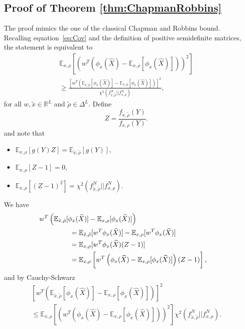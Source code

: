 \documentclass{IEEEtran}
\numberwithin{equation}{section}
\numberwithin{figure}{section}
\theoremstyle{plain}
\theoremstyle{definition}
\theoremstyle{remark}
\theoremstyle{plain}
\theoremstyle{remark}
\theoremstyle{plain}
\theoremstyle{plain}
\theoremstyle{remark}
\newcommand{\RL}{\mathbb{R}^L}
\newcommand{\E}{\mathbb{E}}
\begin{document}
\subsection{Proof of Theorem \ref{thm:ChapmanRobbins}}
\label{proof:ChapmanRobbins}
The proof mimics the one of the classical Chapman and Robbins bound. Recalling equation~\eqref{eq:Cov} and the definition of positive semidefinite matrices, the statement is equivalent to 
\begin{multline}\label{eq:chapmanrobbins}
\E_{x,\rho}\left[\left(w^T(\phi_x(\widehat X)-\E_{x,\rho}[\phi_{x}(\widehat X)])\right)^2\right]\\\ge \frac{\left[w^T\left(\E_{\tilde x,\tilde \rho}[\phi_{x}(\widehat X)]-\E_{x,\rho}[\phi_{x}(\widehat X)]\right)\right]^2}{\chi^2(f^N_{\tilde x,\tilde \rho}||f^N_{x,\rho})},
\end{multline}
for all $w,\tilde x\in\RL$ and $\tilde \rho\in \Delta^L$. Define $$Z=\frac{f_{\tilde x,\tilde \rho}(Y)}{f_{x,\rho}(Y)}.$$
and note that
\begin{itemize}
	\item $\E_{x,\rho}[g(Y)Z]=\E_{\tilde x,\tilde \rho}[g(Y)],$ 
	\item $\E_{x,\rho}[Z-1]=0,$
	\item $\E_{x,\rho}[(Z-1)^2]=\chi^2(f^N_{\tilde x,\tilde \rho}||f^N_{x,\rho}).$
\end{itemize}
We have
\begin{align*}
w^T\left(\E_{\tilde x,\tilde \rho}[\phi_{x}(\widehat X)]-\E_{x,\rho}[\phi_{x}(\widehat X)]\right)\hspace{-98pt}\\
&=
\E_{\tilde x,\tilde \rho}[w^T \phi_x(\widehat X)]-\E_{x,\rho}[w^T \phi_x(\widehat X)]\\
&=\E_{x,\rho}[w^T \phi_x(\widehat X)(Z-1)]\\
&=\E_{x,\rho}\left[w^T\left(\phi_x(\widehat X)-\E_{x,\rho}[\phi_{x}(\widehat X)]\right)(Z-1)\right],
\end{align*}
and by Cauchy-Schwarz
\begin{multline*}
\left[w^T\left(\E_{\tilde x,\tilde \rho}[\phi_{x}(\widehat X)]-\E_{x,\rho}[\phi_{x}(\widehat X)]\right)\right]^2\\
\le \E_{x,\rho}[(w^T(\phi_x(\widehat X)-\E_{x,\rho}[\phi_{x}(\widehat X)]))^2]\chi^2(f^N_{\tilde x,\tilde \rho}||f^N_{x,\rho}).
\end{multline*}
\end{document}
